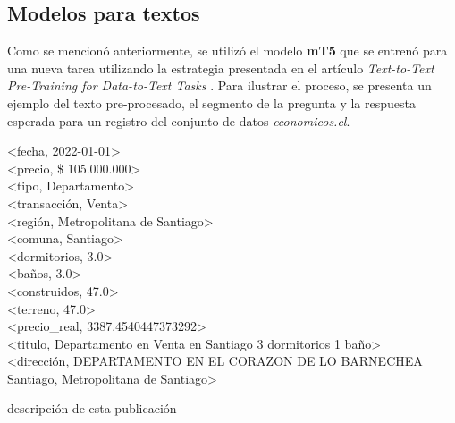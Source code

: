 \newpage
\subsection{Modelos para textos}
Como se mencionó anteriormente, se utilizó el modelo \textbf{mT5} que se entrenó para una nueva tarea utilizando la estrategia presentada en el artículo \emph{Text-to-Text Pre-Training for Data-to-Text Tasks} \cite{kale_text--text_2020}. Para ilustrar el proceso, se presenta un ejemplo del texto pre-procesado, el segmento de la pregunta y la respuesta esperada para un registro del conjunto de datos \emph{economicos.cl}.

\begin{tcolorbox}[colback=white,colframe=black!50!white,title=Input]
<fecha, 2022-01-01>\\
<precio, \$ 105.000.000>\\
<tipo, Departamento>\\
<transacci\'on, Venta>\\
<regi\'on, Metropolitana de Santiago>\\
<comuna, Santiago>\\
<dormitorios, 3.0>\\
<ba\~nos, 3.0>\\
<construidos, 47.0>\\
<terreno, 47.0>\\
<precio\_real, 3387.4540447373292>\\
<titulo, Departamento en Venta en Santiago 3 dormitorios 1 ba\~no>\\
<direcci\'on, DEPARTAMENTO EN EL CORAZON DE LO BARNECHEA Santiago, Metropolitana de Santiago>
\end{tcolorbox}
\begin{tcolorbox}[colback=white,colframe=black!50!white,title=Tarea]
descripci\'on de esta publicaci\'on
\end{tcolorbox}
